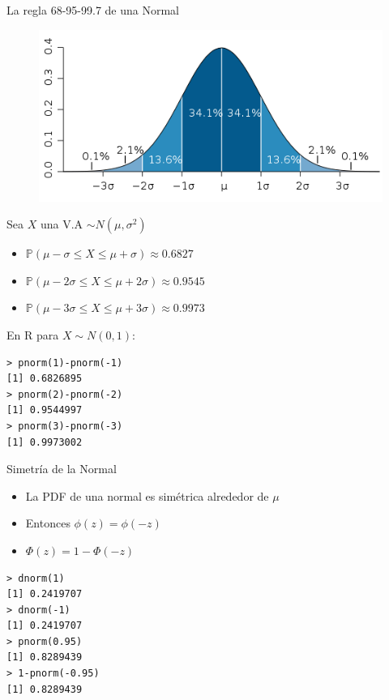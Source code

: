 \documentclass[handout]{beamer}
\begin{document}
\begin{frame}[fragile]{La regla 68-95-99.7 de una Normal}
\scriptsize{
\begin{figure}[h!]
	\centering
	\includegraphics[scale=0.3]{pics/gaussian.png}
\end{figure} 
Sea $X$ una V.A $\sim N(\mu,\sigma^2)$
\begin{itemize}
 \item $\mathbb{P}( \mu - \sigma \leq X \leq \mu+ \sigma) \approx 0.6827$  
 \item $\mathbb{P}( \mu - 2 \sigma \leq X \leq \mu+ 2 \sigma) \approx 0.9545$               
 \item $\mathbb{P}( \mu - 3 \sigma \leq X \leq \mu+ 3 \sigma) \approx 0.9973$ 

\end{itemize}
En R para $X\sim N(0,1)$:
\begin{verbatim}
> pnorm(1)-pnorm(-1)
[1] 0.6826895
> pnorm(2)-pnorm(-2)
[1] 0.9544997
> pnorm(3)-pnorm(-3)
[1] 0.9973002 
\end{verbatim}
}
\end{frame}

\begin{frame}[fragile]{Simetría de la Normal}
\begin{itemize}
 \item La PDF de una normal es simétrica alrededor de $\mu$
 \item Entonces $\phi(z)= \phi(-z) $ 
 \item $\Phi(z)=1-\Phi(-z)$
\end{itemize}
\begin{verbatim}
> dnorm(1)
[1] 0.2419707
> dnorm(-1)
[1] 0.2419707
> pnorm(0.95)
[1] 0.8289439
> 1-pnorm(-0.95)
[1] 0.8289439 
\end{verbatim}


\end{frame}
\end{document}
